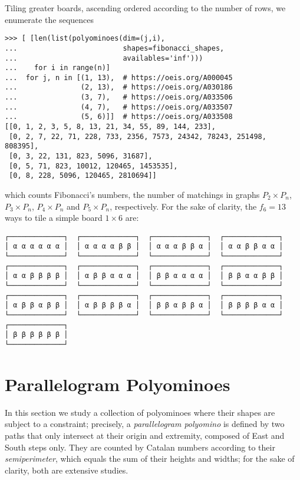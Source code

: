 Tiling greater boards, ascending ordered according to the
number of rows, we enumerate the sequences
\begin{verbatim}
>>> [ [len(list(polyominoes(dim=(j,i),
...                         shapes=fibonacci_shapes,
...                         availables='inf')))
...    for i in range(n)]
...  for j, n in [(1, 13),  # https://oeis.org/A000045
...               (2, 13),  # https://oeis.org/A030186
...               (3, 7),   # https://oeis.org/A033506
...               (4, 7),   # https://oeis.org/A033507
...               (5, 6)]]  # https://oeis.org/A033508
[[0, 1, 2, 3, 5, 8, 13, 21, 34, 55, 89, 144, 233],
 [0, 2, 7, 22, 71, 228, 733, 2356, 7573, 24342, 78243, 251498, 808395],
 [0, 3, 22, 131, 823, 5096, 31687],
 [0, 5, 71, 823, 10012, 120465, 1453535],
 [0, 8, 228, 5096, 120465, 2810694]]
\end{verbatim}
which counts Fibonacci's numbers, the number of matchings in graphs $P_2 \times
P_n$, $P_{3} \times P_{n}$, $P_{4} \times P_{n}$ and $P_{5} \times P_{n}$,
respectively. For the sake of clarity, the $f_{6} = 13$ ways to tile a
simple board $1\times 6$ are:
\begin{Verbatim}[baselinestretch=0.1]
┌─────────────┐  ┌─────────────┐  ┌─────────────┐  ┌─────────────┐
│ α α α α α α │  │ α α α α β β │  │ α α α β β α │  │ α α β β α α │
└─────────────┘  └─────────────┘  └─────────────┘  └─────────────┘
┌─────────────┐  ┌─────────────┐  ┌─────────────┐  ┌─────────────┐
│ α α β β β β │  │ α β β α α α │  │ β β α α α α │  │ β β α α β β │
└─────────────┘  └─────────────┘  └─────────────┘  └─────────────┘
┌─────────────┐  ┌─────────────┐  ┌─────────────┐  ┌─────────────┐
│ α β β α β β │  │ α β β β β α │  │ β β α β β α │  │ β β β β α α │
└─────────────┘  └─────────────┘  └─────────────┘  └─────────────┘
┌─────────────┐
│ β β β β β β │
└─────────────┘
\end{Verbatim}

\section{Parallelogram Polyominoes}

In this section we study a collection of polyominoes where their shapes are
subject to a constraint; precisely, a \textit{parallelogram polyomino} is
defined by two paths that only intersect at their origin and extremity,
composed of East and South steps only. They are counted by Catalan numbers
according to their \textit{semiperimeter}, which equals the sum of their
heights and widths; for the sake of clarity, both
\citep{delest1993enumeration,delest:enumeration:pp} are extensive studies.


